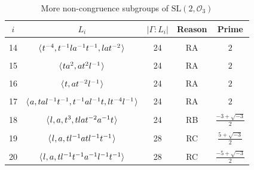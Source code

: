 \documentclass[11pt]{amsart}
\theoremstyle{definition}
\theoremstyle{remark}
\newcommand{\G}{{\Gamma}}
\newcommand{\SL}{\mathrm{SL}}
\begin{document}
\begin{table}[h!]
  \begin{center}
    \caption{More non-congruence subgroups of $\SL(2, \mathcal{O}_3)$}
    \label{Tabe4}
    \begin{tabular}{|c|c|c|c|c|}
      \hline
$i$ & $L_i$ & $|\G : L_i|$&Reason&Prime \\
\hline
\vspace{-12pt} & & & &   \\
14& $\langle \hspace{.75pt} t^{-4}, t^{-1}la^{-1}t^{-1}, lat^{-2} 
\hspace{.75pt}\rangle$&24&RA& $2$ \\
\vspace{-12pt} & & & &   \\
15& $\langle \hspace{.75pt} ta^2, at^2l^{-1} \hspace{.75pt}\rangle$
&24&RA& $2$ \\
\vspace{-12pt} & & & &   \\
16& $\langle \hspace{.75pt} t, at^{-2}l^{-1} \hspace{.75pt}\rangle$
&24& RA& $2$ \\
\vspace{-12pt} & & & &   \\
17& $\langle \hspace{.75pt} a, tal^{-1}t^{-1}, 
 t^{-1}al^{-1}t, lt^{-4}l^{-1} \hspace{.75pt}\rangle$
&24& RA& $2$ \\
\vspace{-12pt} & & & &   \\
18& $\langle \hspace{.75pt} l, a, t^3, tlat^{-2}a^{-1}t \hspace{.75pt}\rangle$
&24& RB& $\frac{-3+\sqrt{-3}}{2}$ \\
\vspace{-12pt} & & & &   \\
19& $\langle \hspace{.75pt} l, a, tl^{-1}atl^{-1}t^{-1} \hspace{.75pt}\rangle$
&28& RC& $\frac{5+\sqrt{-3}}{2}$ \\
\vspace{-12pt} & & & &   \\
20& $\langle \hspace{.75pt} l, a, tl^{-1}t^{-1}a^{-1}l^{-1}t^{-1}\rangle$ &28& RC&
$\frac{-5+\sqrt{-3}}{2}$ \\

\end{tabular}
\end{center}
\end{table}
\end{document}

